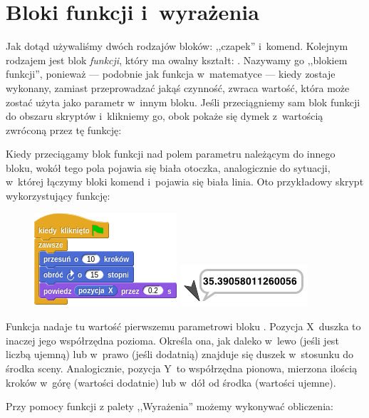 \documentclass[a4paper]{report}
\begin{document}
\section{Bloki funkcji i~wyrażenia}

Jak dotąd używaliśmy dwóch rodzajów bloków: ,,czapek'' i~komend. Kolejnym rodzajem jest blok \emph{funkcji}, który ma owalny kształt: . Nazywamy go ,,blokiem funkcji'', ponieważ --- podobnie jak funkcja w~matematyce --- kiedy zostaje wykonany, zamiast przeprowadzać jakąś czynność, zwraca wartość, która może zostać użyta jako parametr w~innym bloku. Jeśli przeciągniemy sam blok funkcji do obszaru skryptów i~klikniemy go, obok pokaże się dymek z~wartością zwróconą przez tę funkcję:\nopagebreak


Kiedy przeciągamy blok funkcji nad polem parametru należącym do innego bloku, wokół tego pola pojawia się biała otoczka, analogicznie do sytuacji, w~której łączymy bloki komend i~pojawia się biała linia. Oto przykładowy skrypt wykorzystujący funkcję:\nopagebreak

\begin{figure}[H]
\centering
\includegraphics[scale=\defaultGraphicsScale]{przykladowy-skrypt-wykorzystujacy-funkcje}%
\hspace{2em}%
\includegraphics{../common/turtle-says-its-position}
\end{figure}

Funkcja  nadaje tu wartość pierwszemu parametrowi bloku . Pozycja X~duszka to inaczej jego współrzędna pozioma. Określa ona, jak daleko w~lewo (jeśli jest liczbą ujemną) lub w~prawo (jeśli dodatnią) znajduje się duszek w~stosunku do środka sceny. Analogicznie, pozycja Y~to współrzędna pionowa, mierzona ilością kroków w~górę (wartości dodatnie) lub w~dół od środka (wartości ujemne).

Przy pomocy funkcji z palety ,,Wyrażenia'' możemy wykonywać obliczenia:\nopagebreak
\end{document}
